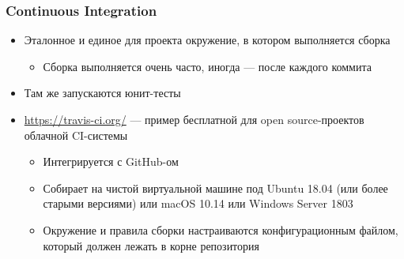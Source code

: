 \documentclass[xetex,mathserif,serif]{beamer}
\begin{document}
	\begin{frame}
		\frametitle{Continuous Integration}
		\begin{itemize}
			\item Эталонное и единое для проекта окружение, в котором выполняется сборка
			\begin{itemize}
				\item Сборка выполняется очень часто, иногда --- после каждого коммита
			\end{itemize}
			\item Там же запускаются юнит-тесты
			\item \url{https://travis-ci.org/} --- пример бесплатной для open source-проектов облачной CI-системы
			\begin{itemize}
				\item Интегрируется с GitHub-ом
				\item Собирает на чистой виртуальной машине под Ubuntu 18.04 (или более старыми версиями) или macOS 10.14 или Windows Server 1803
				\item Окружение и правила сборки настраиваются конфигурационным файлом, который должен лежать в корне репозитория
			\end{itemize}
		\end{itemize}
	\end{frame}
\end{document}
